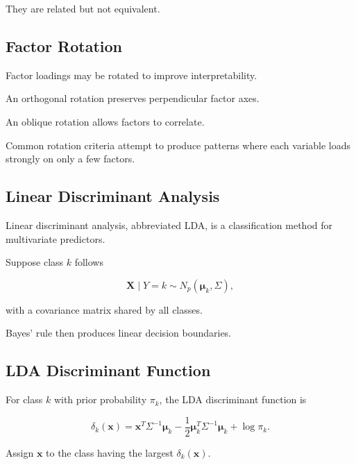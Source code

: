 They are related but not equivalent.

\subsection{Factor Rotation}
\label{subsec:factor-rotation}

Factor loadings may be rotated to improve interpretability.

An orthogonal rotation preserves perpendicular factor axes.

An oblique rotation allows factors to correlate.

Common rotation criteria attempt to produce patterns where each variable
loads strongly on only a few factors.

\subsection{Linear Discriminant Analysis}
\label{subsec:linear-discriminant-analysis}

Linear discriminant analysis, abbreviated LDA, is a classification method
for multivariate predictors.

Suppose class \(k\) follows

\[
\boxed{
\mathbf{X}
\mid
Y=k
\sim
N_p
(
\boldsymbol{\mu}_k,
\Sigma
),
}
\]

with a covariance matrix shared by all classes.

Bayes' rule then produces linear decision boundaries.

\subsection{LDA Discriminant Function}
\label{subsec:lda-discriminant-function}

For class \(k\) with prior probability \(\pi_k\), the LDA discriminant
function is

\[
\boxed{
\delta_k(\mathbf{x})
=
\mathbf{x}^T
\Sigma^{-1}
\boldsymbol{\mu}_k
-
\frac12
\boldsymbol{\mu}_k^T
\Sigma^{-1}
\boldsymbol{\mu}_k
+
\log\pi_k.
}
\]

Assign \(\mathbf{x}\) to the class having the largest
\(\delta_k(\mathbf{x})\).

